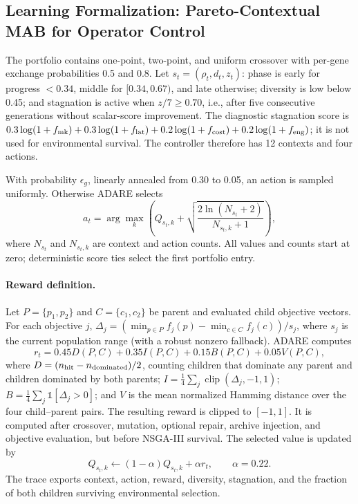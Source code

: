 \documentclass[preprint,12pt]{elsarticle}
\begin{document}
\subsection{Learning Formalization: Pareto-Contextual MAB for Operator Control}
\label{sec:mab}
The portfolio contains one-point, two-point, and uniform crossover with per-gene exchange probabilities 0.5 and 0.8. Let $s_t=(\rho_t,d_t,z_t)$: phase is early for progress $<0.34$, middle for $[0.34,0.67)$, and late otherwise; diversity is low below 0.45; and stagnation is active when $z/7\geq0.70$, i.e., after five consecutive generations without scalar-score improvement. The diagnostic stagnation score is $0.3\log(1+f_{\rm mk})+0.3\log(1+f_{\rm lat})+0.2\log(1+f_{\rm cost})+0.2\log(1+f_{\rm eng})$; it is not used for environmental survival. The controller therefore has 12 contexts and four actions.

With probability $\epsilon_g$, linearly annealed from 0.30 to 0.05, an action is sampled uniformly. Otherwise ADARE selects
\begin{equation}
\label{eq:ucb}
a_t = \arg\max_k \left( Q_{s_t,k} + \sqrt{\frac{2 \ln (N_{s_t}+2)}{N_{s_t,k} + 1}} \right),
\end{equation}
where $N_{s_t}$ and $N_{s_t,k}$ are context and action counts. All values and counts start at zero; deterministic score ties select the first portfolio entry.

\paragraph{Reward definition.}
Let $P=\{p_1,p_2\}$ and $C=\{c_1,c_2\}$ be parent and evaluated child objective vectors. For each objective $j$, $\Delta_j=(\min_{p\in P}f_j(p)-\min_{c\in C}f_j(c))/s_j$, where $s_j$ is the current population range (with a robust nonzero fallback). ADARE computes
\begin{equation}
\label{eq:reward}
r_t =
0.45D(P,C) + 0.35I(P,C) + 0.15B(P,C) + 0.05V(P,C),
\end{equation}
where $D=(n_{\rm hit}-n_{\rm dominated})/2$, counting children that dominate any parent and children dominated by both parents; $I=\frac14\sum_j\operatorname{clip}(\Delta_j,-1,1)$; $B=\frac14\sum_j\mathbb{1}[\Delta_j>0]$; and $V$ is the mean normalized Hamming distance over the four child--parent pairs. The resulting reward is clipped to $[-1,1]$. It is computed after crossover, mutation, optional repair, archive injection, and objective evaluation, but before NSGA-III survival. The selected value is updated by
\begin{equation}
Q_{s_t,k} \leftarrow (1-\alpha)Q_{s_t,k} + \alpha r_t,\qquad \alpha=0.22.
\end{equation}
The trace exports context, action, reward, diversity, stagnation, and the fraction of both children surviving environmental selection.
\end{document}
